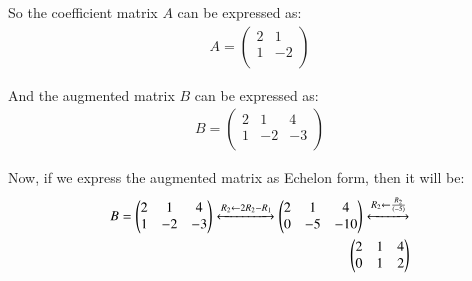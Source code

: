 So the coefficient matrix $A$ can be expressed as:\\

\begin{equation}
\begin{aligned}
    A=  \begin{pmatrix}
      2       & 1\\ 
      1       & -2\\
            
    \end{pmatrix} 
\end{aligned}
\end{equation}
 
And the augmented matrix $B$ can be expressed as:\\

\begin{equation}
\begin{aligned}
    B=  \begin{pmatrix}
      2       & 1   & 4\\ 
      1       & -2  & -3\\
            
    \end{pmatrix} 
\end{aligned}
\end{equation}

Now, if we express the augmented matrix as Echelon form, then it will be:\\

\begin{equation}
\begin{aligned}
    B=  \begin{pmatrix}
      2       & 1   & 4\\ 
      1       & -2  & -3\\
            
    \end{pmatrix}\xleftrightarrow[]{R_2\leftarrow 2R_2 - R_1} 
    \begin{pmatrix}
      2       & 1   & 4\\ 
      0       & -5  & -10\\
            
    \end{pmatrix} \xleftrightarrow[]{R_2\leftarrow \frac{R_2}{(-5)}}\\
    \begin{pmatrix}
      2       & 1   & 4\\ 
      0       & 1  & 2\\
            
    \end{pmatrix}
\end{aligned}
\end{equation}

